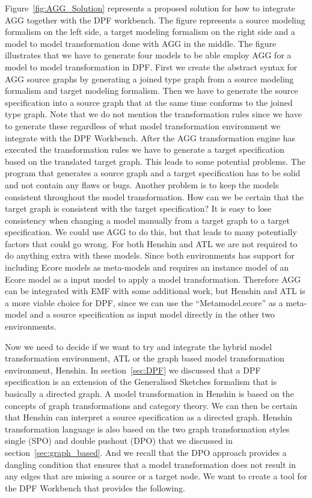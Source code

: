 Figure~\ref{fig:AGG_Solution} represents a proposed solution for how to
integrate AGG together with the DPF workbench. The figure represents a
source modeling formalism on the left side, a target modeling formalism on the
right side and a model to model transformation done with AGG in the middle. The
figure illustrates that we have to generate four models to be able employ AGG
for a model to model transformation in DPF. First we create the abstract syntax
for AGG source graphs by generating a joined type graph from a source modeling
formalism and target modeling formalism. Then we have to generate the source
specification into a source graph that at the same time conforms to the joined
type graph. Note that we do not mention the transformation rules since we have
to generate these regardless of what model transformation environment we
integrate with the DPF Workbench.
After the AGG transformation engine has executed the transformation rules we
have to generate a target specification based on the translated target graph.
This leads to some potential problems. The program that generates a source graph and
a target specification has to be solid and not contain any flaws or bugs.
Another problem is to keep the models consistent throughout the model transformation.
How can we be certain that the target graph is consistent with the target
specification? It is easy to lose consistency when changing a model manually
from a target graph to a target specification. We could use AGG to do this, but
that leads to many potentially factors that could go wrong. For both Henshin and
ATL we are not required to do anything extra with these models. Since both
environments has support for including Ecore models as meta-models and requires
an instance model of an Ecore model as a input model to apply a model
transformation. Therefore AGG can be integrated with EMF with some additional
work, but Henshin and ATL is a more viable choice for DPF, since we can use
the ``Metamodel.ecore'' as a meta-model and a source specification as input
model directly in the other two environments. 

Now we need to decide if we want to try and integrate the hybrid model
transformation environment, ATL or the graph based model transformation
environment, Henshin. In section~\ref{sec:DPF} we discussed that a DPF
specification is an extension of the Generalised Sketches formalism that is
basically a directed graph. A model transformation in Henshin is based on the concepts of graph
transformations and category theory. We can then be certain that Henshin can
interpret a source specification as a directed graph. Henshin transformation
language is also based on the two graph transformation styles single (SPO) and
double pushout (DPO) that we discussed in section~\ref{sec:graph_based}. And we
recall that the DPO approach provides a dangling condition that ensures that a
model transformation does not result in any edges that are missing a source or
a target node. We want to create a tool for the DPF Workbench that provides the
following.

